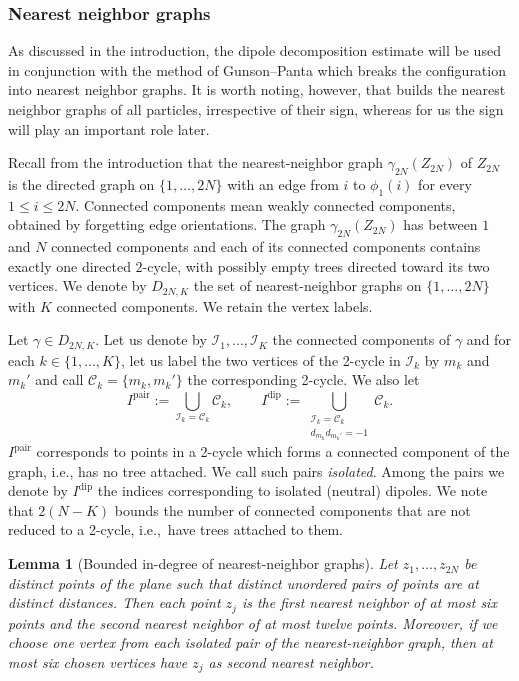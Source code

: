 \documentclass[a4paper,10pt,leqno]{amsart}
\numberwithin{equation}{section}
\newtheorem{lem}[prop]{Lemma}
\newcommand{\dip}{\mathrm{dip}}
\def\pair{\mathrm{pair}}
\begin{document}
\subsubsection*{Nearest neighbor graphs}
As discussed in the introduction, the dipole decomposition estimate will be used in conjunction with the method of Gunson--Panta \cite{GunPan} which breaks the configuration into nearest neighbor graphs. It is worth noting, however, that \cite{GunPan} builds the nearest neighbor graphs of all particles, irrespective of their sign, whereas for us the sign will play an important role later.

Recall from the introduction that the nearest-neighbor graph $\gamma_{2N}(Z_{2N})$ of $Z_{2N}$ is the directed graph on $\{1,\ldots,2N\}$ with an edge from $i$ to $\phi_1(i)$ for every $1\le i\le2N$. Connected components mean weakly connected components, obtained by forgetting edge orientations. The graph $\gamma_{2N}(Z_{2N})$ has between $1$ and $N$ connected components and each of its connected components contains exactly one directed $2$-cycle, with possibly empty trees directed toward its two vertices. We denote by $D_{2N,K}$ the set of nearest-neighbor graphs on $\{1,\ldots,2N\}$ with $K$ connected components. We retain the vertex labels.

Let $\gamma\in D_{2N,K}$. Let us denote by $\mathcal{ I}_1,\ldots,\mathcal{ I}_K$ the connected components of $\gamma$ and for each $k\in \{1,\ldots,K\}$, let us label the two vertices of the 2-cycle in $\mathcal{ I}_k$ by $m_k$ and $m_k'$ and call $\mathcal C_k= \{m_k, m_k'\}$ the corresponding 2-cycle.
We also let
\begin{equation}
  \label{defIdip}
  I^{\pair}:=\bigcup_{\mathcal I_k=\mathcal C_k}\mathcal C_k,
  \qquad I^{\dip}:=\bigcup_{\substack{\mathcal I_k=\mathcal C_k\\d_{m_k}d_{m_k'}=-1}}\mathcal C_k.\end{equation}
$I^\pair$ corresponds to points in a 2-cycle which forms a connected component of the graph, i.e., has no tree attached. We call such pairs \emph{isolated}.
Among the pairs we denote by $I^\dip$ the indices corresponding to
isolated (neutral) dipoles.
We note that $2(N-K)$ bounds the number of connected components that are not reduced to a 2-cycle, i.e.,~have trees attached to them.

\begin{lem}[Bounded in-degree of nearest-neighbor graphs]\label{lem:in-degree}
  Let $z_1,\ldots,z_{2N}$ be distinct points of the plane such that distinct unordered pairs of points are at distinct distances. Then each point $z_j$ is the first nearest neighbor of at most six points and the second nearest neighbor of at most twelve points. Moreover, if we choose one vertex from each isolated pair of the nearest-neighbor graph, then at most six chosen vertices have $z_j$ as second nearest neighbor.
\end{lem}
\end{document}
